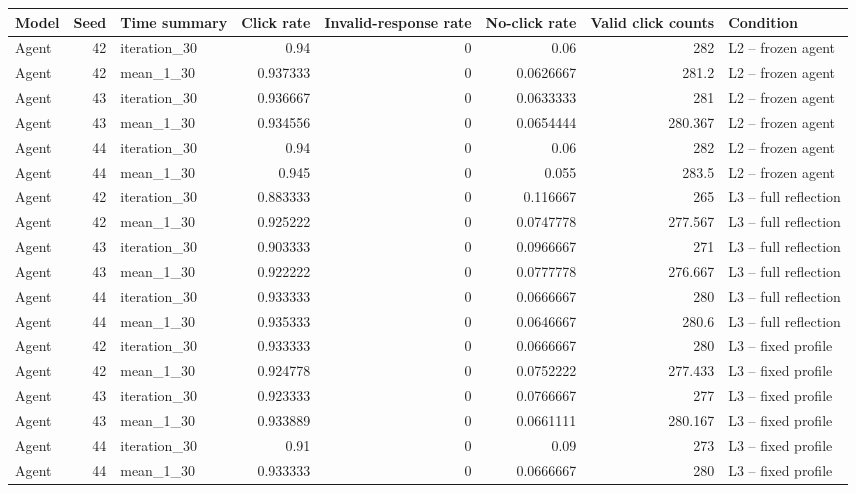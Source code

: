 \begin{table}[htbp!]
\centering
\small
\setlength{\tabcolsep}{3pt}
\renewcommand{\arraystretch}{1.1}
\begin{tabular}{lrlrrrrl}
\hline
Model & Seed & Time summary & Click rate & Invalid-response rate & No-click rate & Valid click counts & Condition \\
\hline
Agent & 42 & iteration\_30 & 0.94 & 0 & 0.06 & 282 & L2 -- frozen agent \\
Agent & 42 & mean\_1\_30 & 0.937333 & 0 & 0.0626667 & 281.2 & L2 -- frozen agent \\
Agent & 43 & iteration\_30 & 0.936667 & 0 & 0.0633333 & 281 & L2 -- frozen agent \\
Agent & 43 & mean\_1\_30 & 0.934556 & 0 & 0.0654444 & 280.367 & L2 -- frozen agent \\
Agent & 44 & iteration\_30 & 0.94 & 0 & 0.06 & 282 & L2 -- frozen agent \\
Agent & 44 & mean\_1\_30 & 0.945 & 0 & 0.055 & 283.5 & L2 -- frozen agent \\
Agent & 42 & iteration\_30 & 0.883333 & 0 & 0.116667 & 265 & L3 -- full reflection \\
Agent & 42 & mean\_1\_30 & 0.925222 & 0 & 0.0747778 & 277.567 & L3 -- full reflection \\
Agent & 43 & iteration\_30 & 0.903333 & 0 & 0.0966667 & 271 & L3 -- full reflection \\
Agent & 43 & mean\_1\_30 & 0.922222 & 0 & 0.0777778 & 276.667 & L3 -- full reflection \\
Agent & 44 & iteration\_30 & 0.933333 & 0 & 0.0666667 & 280 & L3 -- full reflection \\
Agent & 44 & mean\_1\_30 & 0.935333 & 0 & 0.0646667 & 280.6 & L3 -- full reflection \\
Agent & 42 & iteration\_30 & 0.933333 & 0 & 0.0666667 & 280 & L3 -- fixed profile \\
Agent & 42 & mean\_1\_30 & 0.924778 & 0 & 0.0752222 & 277.433 & L3 -- fixed profile \\
Agent & 43 & iteration\_30 & 0.923333 & 0 & 0.0766667 & 277 & L3 -- fixed profile \\
Agent & 43 & mean\_1\_30 & 0.933889 & 0 & 0.0661111 & 280.167 & L3 -- fixed profile \\
Agent & 44 & iteration\_30 & 0.91 & 0 & 0.09 & 273 & L3 -- fixed profile \\
Agent & 44 & mean\_1\_30 & 0.933333 & 0 & 0.0666667 & 280 & L3 -- fixed profile \\

\end{tabular}
\end{table}

